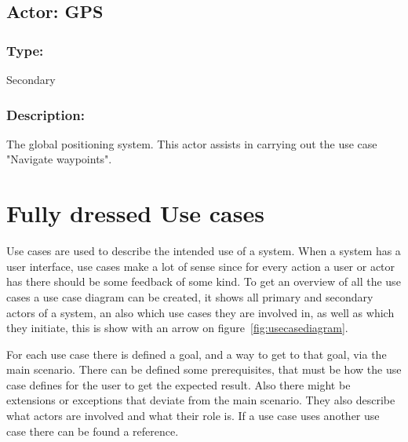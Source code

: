 \begin{framed}
	\subsection{Actor: GPS}
		\subsubsection*{Type:}
			Secondary
	
		\subsubsection*{Description:}
			The global positioning system. This actor assists in carrying out the use case "Navigate waypoints".
	
\end{framed}

\section{Fully dressed Use cases }
Use cases are used to describe the intended use of a system. When a system has a user interface, use cases make a lot of sense since for every action a user or actor has there should be some feedback of some kind. To get an overview of all the use cases a use case diagram can be created, it shows all primary and secondary actors of a system, an also which use cases they are involved in, as well as which they initiate, this is show with an arrow on figure~\ref{fig:usecasediagram}.

For each use case there is defined a goal, and a way to get to that goal, via the main scenario. There can be defined some prerequisites, that must be how the use case defines for the user to get the expected result. Also there might be extensions or exceptions that deviate from the main scenario. They also describe what actors are involved and what their role is. If a use case uses another use case there can be found a reference.

